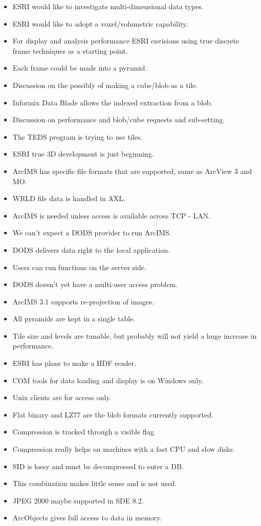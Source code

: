 \begin{itemize}
\item ESRI would like to investigate multi-dimensional data types.
\item ESRI would like to adopt a voxel/volumetric capability.
\item For display and analysis performance ESRI envisions using true discrete frame 
techniques as a starting point.
\item Each frame could be made into a pyramid.
\item Discussion on the possibly of making a cube/blob as a tile.
\item Informix Data Blade allows the indexed extraction from a blob.
\item Discussion on performance and blob/cube requests and sub-setting.
\item The TEDS program is trying to use tiles.
\item ESRI true 3D development is just beginning.
\item ArcIMS has specific file formats that are supported, same as ArcView 3 and MO.
\item WRLD file data is handled in AXL.
\item ArcIMS is needed unless access is available across TCP - LAN.
\item We can't expect a DODS provider to run ArcIMS.
\item DODS delivers data right to the local application.
\item Users can run functions on the server side.
\item DODS doesn't yet have a multi-user access problem.
\item ArcIMS 3.1 supports re-projection of images.
\item All pyramids are kept in a single table.
\item Tile size and levels are tunable, but probably will not yield a huge increase in 
performance.
\item ESRI has plans to make a HDF reader.
\item COM tools for data loading and display is on Windows only.
\item Unix clients are for access only.
\item Flat binary and LZ77 are the blob formats currently supported.
\item Compression is tracked through a visible flag.
\item Compression really helps on machines with a fast CPU and slow disks.
\item SID is lossy and must be decompressed to enter a DB.
\item This combination makes little sense and is not used.
\item JPEG 2000 maybe supported in SDE 8.2.
\item ArcObjects gives full access to data in memory.
\end{itemize}


